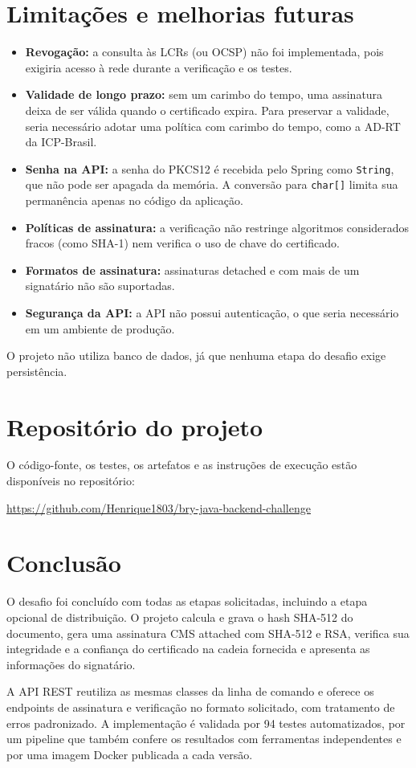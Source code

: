 \documentclass[12pt,a4paper]{article}
\begin{document}
\section{Limitações e melhorias futuras}

\begin{itemize}
    \item \textbf{Revogação:} a consulta às LCRs (ou OCSP) não foi implementada, pois exigiria acesso à rede durante a verificação e os testes.
    \item \textbf{Validade de longo prazo:} sem um carimbo do tempo, uma assinatura deixa de ser válida quando o certificado expira. Para preservar a validade, seria necessário adotar uma política com carimbo do tempo, como a AD-RT da ICP-Brasil.
    \item \textbf{Senha na API:} a senha do PKCS12 é recebida pelo Spring como \texttt{String}, que não pode ser apagada da memória. A conversão para \texttt{char[]} limita sua permanência apenas no código da aplicação.
    \item \textbf{Políticas de assinatura:} a verificação não restringe algoritmos considerados fracos (como SHA-1) nem verifica o uso de chave do certificado.
    \item \textbf{Formatos de assinatura:} assinaturas detached e com mais de um signatário não são suportadas.
    \item \textbf{Segurança da API:} a API não possui autenticação, o que seria necessário em um ambiente de produção.
\end{itemize}

O projeto não utiliza banco de dados, já que nenhuma etapa do desafio exige persistência.

\section{Repositório do projeto}

O código-fonte, os testes, os artefatos e as instruções de execução estão disponíveis no repositório:

\begin{center}
    \url{https://github.com/Henrique1803/bry-java-backend-challenge}
\end{center}

\section{Conclusão}

O desafio foi concluído com todas as etapas solicitadas, incluindo a etapa opcional de distribuição. O projeto calcula e grava o hash SHA-512 do documento, gera uma assinatura CMS attached com SHA-512 e RSA, verifica sua integridade e a confiança do certificado na cadeia fornecida e apresenta as informações do signatário.

A API REST reutiliza as mesmas classes da linha de comando e oferece os endpoints de assinatura e verificação no formato solicitado, com tratamento de erros padronizado. A implementação é validada por 94 testes automatizados, por um pipeline que também confere os resultados com ferramentas independentes e por uma imagem Docker publicada a cada versão.
\end{document}
